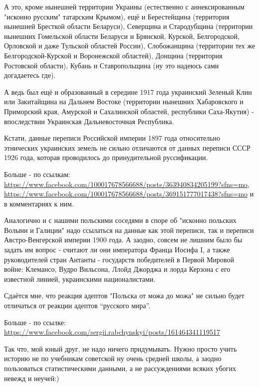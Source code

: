 \begin{itemize}
\begin{itemize}
А это, кроме нынешней территории Украины (естественно с аннексированным
"исконно русским" татарским Крымом), ещё и Берестейщина (территория нынешней
Бресткой области Беларуси), Северщина и Стародубщина (территории нынешних
Гомельской области Беларуси и Брянской, Курской, Белгородской, Орловской и даже
Тульской областей России), Слобожанщина (территории тех же Белгородской-Курской
и Воронежской областей), Донщина (территория Ростовской области), Кубань и
Ставропольщина (ну это надеюсь сами догадаетесь где).

А ведь был ещё и образованный в середине 1917 года украинский Зеленый Клин или
Закитайщина на Дальнем Востоке (территории нынешних Хабаровского и Приморский
края, Амурской и Сахалинской областей, республики Саха-Якутия) - впоследствии
Украинская Дальневосточная Республика.

Кстати, данные переписи Российской империи 1897 года относительно этнических
украинских земель не сильно отличаются от данных переписи СССР 1926 года,
которая проводилось до принудительной руссификации.

Больше - по ссылкам:
\url{https://www.facebook.com/100017678566688/posts/363940834205199?sfns=mo},
\url{https://www.facebook.com/100017678566688/posts/369151777017438?sfns=mo} и в
комментариях к ним.

Аналогично и с нашими польскими соседями в споре об "исконно польских Волыни и
Галиции" надо ссылаться на данные как этой переписи, так и переписи
Австро-Венгерской империи 1900 года. А заодно, совсем не лишним было бы задать
им вопрос - считают ли они императора Франца Иосифа I, а также руководителей
стран Антанты - государств победителей в Первой Мировой войне: Клемансо, Вудро
Вильсона, Ллойд Джорджа и лорда Керзона с его известной линией, украинскими
националистами.

Сдаётся мне, что реакция адептов "Польска от можа до можа" не сильно будет
отличаться от реакции адептов “русского мира”.

Больше - по ссылке: \url{https://www.facebook.com/sergii.rabchynskyi/posts/161464341119517}

Так что, мой юный друг, не надо ничего придумывать. Нужно просто учить историю
не по учебникам советской ну очень средней школы, а заодно пользоваться
статистическими данными, а не рассуждениями всяких убогих невежд и неучей:)

\end{itemize}

 

\end{itemize}
